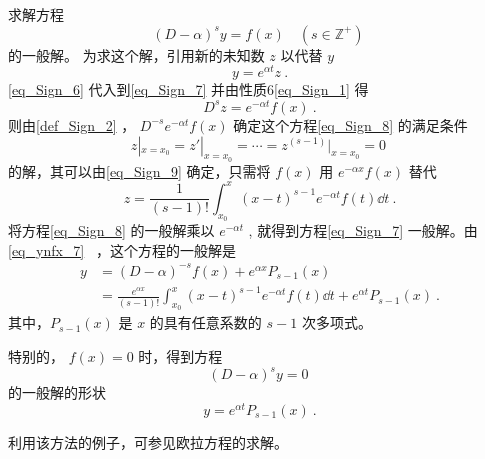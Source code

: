 \begin{example}{}
求解方程
\begin{equation}\label{eq_Sign_7}
(D-\alpha)^sy=f(x) \quad (s\in \mathbb{Z}^{+})~
\end{equation}
的一般解。
为求这个解，引用新的未知数 $z$ 以代替 $y$
\begin{equation}\label{eq_Sign_6}
y=e^{\alpha t}z~.
\end{equation}
\autoref{eq_Sign_6} 代入到\autoref{eq_Sign_7} 并由性质6\autoref{eq_Sign_1} 得
\begin{equation}\label{eq_Sign_8}
D^sz=e^{-\alpha t}f(x)~.
\end{equation}
则由\autoref{def_Sign_2} ， $D^{-s}e^{-\alpha t}f(x)$ 确定这个方程\autoref{eq_Sign_8} 的满足条件
\begin{equation}
z|_{x=x_0}=z'|_{x=x_0}=\cdots=z^{(s-1)}|_{x=x_0}=0~
\end{equation}
的解，其可以由\autoref{eq_Sign_9} 确定，只需将 $f(x)$ 用 $e^{-\alpha x}f(x)$ 替代
\begin{equation}
z=\frac{1}{(s-1)!}\int_{x_0}^x(x-t)^{s-1}e^{-\alpha t}f(t)\dd t~.
\end{equation}
将方程\autoref{eq_Sign_8} 的一般解乘以 $e^{-\alpha t}$ , 就得到方程\autoref{eq_Sign_7} 一般解。由\autoref{eq_ynfx_7}~ ，这个方程的一般解是
\begin{equation}
\begin{aligned}
y&=(D-\alpha)^{-s}f(x)+e^{\alpha x}P_{s-1}(x)\\
&=\frac{e^{\alpha x}}{(s-1)!}\int_{x_0}^x(x-t)^{s-1}e^{-\alpha t}f(t)\dd t+e^{\alpha t}P_{s-1}(x)~.
\end{aligned}
\end{equation}
其中，$P_{s-1}(x)$ 是 $x$ 的具有任意系数的 $s-1$ 次多项式。

特别的， $f(x)=0$ 时，得到方程
\begin{equation}
(D-\alpha)^sy=0~
\end{equation}
的一般解的形状
\begin{equation}
y=e^{\alpha t}P_{s-1}(x)~.
\end{equation}

\end{example}
利用该方法的例子，可参见欧拉方程的求解。
